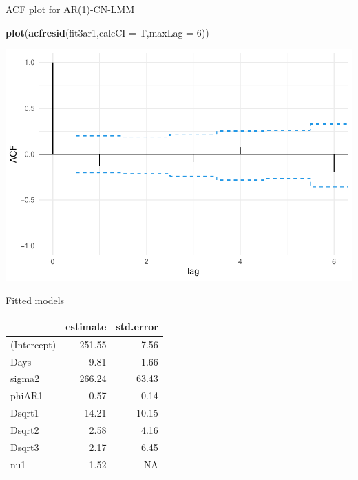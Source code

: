 \documentclass[
  ignorenonframetext,
]{beamer}
\newenvironment{Shaded}{\begin{snugshade}}{\end{snugshade}}
\newcommand{\CommentTok}[1]{\textcolor[rgb]{0.56,0.35,0.01}{\textit{#1}}}
\newcommand{\DataTypeTok}[1]{\textcolor[rgb]{0.13,0.29,0.53}{#1}}
\newcommand{\DecValTok}[1]{\textcolor[rgb]{0.00,0.00,0.81}{#1}}
\newcommand{\KeywordTok}[1]{\textcolor[rgb]{0.13,0.29,0.53}{\textbf{#1}}}
\newcommand{\NormalTok}[1]{#1}
\newcommand{\OperatorTok}[1]{\textcolor[rgb]{0.81,0.36,0.00}{\textbf{#1}}}
\newcommand{\StringTok}[1]{\textcolor[rgb]{0.31,0.60,0.02}{#1}}
\begin{document}
\begin{frame}[fragile]{ACF plot for AR(1)-CN-LMM}
\protect\hypertarget{acf-plot-for-ar1-cn-lmm}{}

\begin{Shaded}
\begin{Highlighting}[]
\KeywordTok{plot}\NormalTok{(}\KeywordTok{acfresid}\NormalTok{(fit3ar1,}\DataTypeTok{calcCI =}\NormalTok{ T,}\DataTypeTok{maxLag =} \DecValTok{6}\NormalTok{))}
\end{Highlighting}
\end{Shaded}

\begin{center}\includegraphics[width=0.85\linewidth]{codes_files/figure-beamer/acf2-1} \end{center}

\end{frame}

\begin{frame}[fragile]{Fitted models}
\protect\hypertarget{fitted-models}{}

\scriptsize

\begin{Shaded}
\end{Shaded}

\begin{longtable}[]{@{}lrr@{}}
\toprule
& estimate & std.error\tabularnewline
\midrule
\endhead
(Intercept) & 251.55 & 7.56\tabularnewline
Days & 9.81 & 1.66\tabularnewline
sigma2 & 266.24 & 63.43\tabularnewline
phiAR1 & 0.57 & 0.14\tabularnewline
Dsqrt1 & 14.21 & 10.15\tabularnewline
Dsqrt2 & 2.58 & 4.16\tabularnewline
Dsqrt3 & 2.17 & 6.45\tabularnewline
nu1 & 1.52 & NA\tabularnewline
\bottomrule
\end{longtable}

\end{frame}
\end{document}
